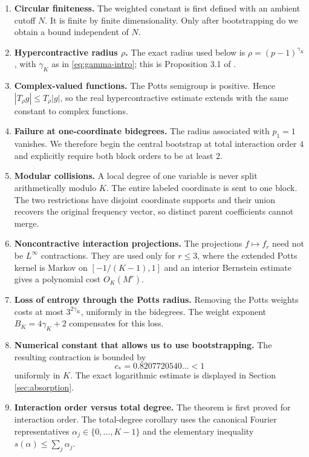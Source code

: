 \documentclass[11pt]{article}
\theoremstyle{definition}
\theoremstyle{remark}
\newcommand{\abs}[1]{\left\lvert #1\right\rvert}
\begin{document}
\begin{enumerate}
\item \textbf{Circular finiteness.}
The weighted constant is first defined with an ambient cutoff $N$.  It is
finite by finite dimensionality.  Only after bootstrapping do we obtain a bound
independent of $N$.

\item \textbf{Hypercontractive radius $\rho$.}
The exact radius used below is
$\rho=(p-1)^{\gamma_K}$, with $\gamma_K$ as in
\eqref{eq:gamma-intro}; this is Proposition 3.1 of
\cite{PellegrinoRaposo}.  

\item \textbf{Complex-valued functions.}
The Potts semigroup is positive.  Hence
$\abs{T_\rho g}\le T_\rho\abs g$, so the real hypercontractive estimate
extends with the same constant to complex functions.

\item \textbf{Failure at one-coordinate bidegrees.}
The radius associated with $p_1=1$ vanishes.  We therefore begin the central
bootstrap at total interaction order $4$ and explicitly require both block
orders to be at least $2$.

\item \textbf{Modular collisions.}
A local degree of one variable is never split arithmetically modulo $K$.  The entire
labeled coordinate is sent to one block.  The two restrictions have disjoint
coordinate supports and their union recovers the original frequency vector,
so distinct parent coefficients cannot merge.

\item \textbf{Noncontractive interaction projections.}
The projections $f\mapsto f_r$ need not be $L^\infty$ contractions.  They are
used only for $r\le3$, where the extended Potts kernel is Markov on
$[-1/(K-1),1]$ and an interior Bernstein estimate gives a polynomial cost
$O_K(M^r)$.

\item \textbf{Loss of entropy through the Potts radius.}
Removing the Potts weights costs at most $3^{2\gamma_K}$, uniformly in the
bidegrees.  The weight exponent $B_K=4\gamma_K+2$ compensates for this loss.

\item \textbf{Numerical constant that allows us to use bootstrapping.}
The resulting contraction is bounded by
\[
 c_*=0.8207720540\ldots<1
\]
uniformly in $K$.  The exact logarithmic estimate is displayed in
Section \ref{sec:absorption}.

\item \textbf{Interaction order versus total degree.}
The theorem is first proved for interaction order.  The total-degree
corollary uses the canonical Fourier representatives
$\alpha_j\in\{0,\ldots,K-1\}$ and the elementary inequality
$s(\alpha)\le\sum_j\alpha_j$.
\end{enumerate}
\end{document}
